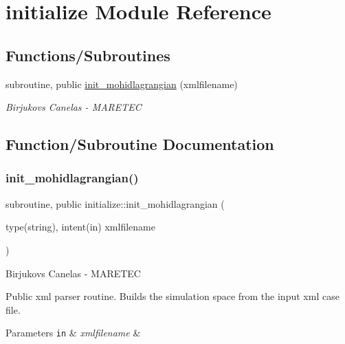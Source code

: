 \hypertarget{namespaceinitialize}{}\section{initialize Module Reference}
\label{namespaceinitialize}
\subsection*{Functions/\+Subroutines}
\begin{DoxyCompactItemize}
\item 
subroutine, public \mbox{\hyperlink{namespaceinitialize_a0872e23f1959251154095edd3808e019}{init\+\_\+mohidlagrangian}} (xmlfilename)
\begin{DoxyCompactList}\small\item\em Birjukovs Canelas -\/ M\+A\+R\+E\+T\+EC \end{DoxyCompactList}\end{DoxyCompactItemize}


\subsection{Function/\+Subroutine Documentation}
\mbox{\label{namespaceinitialize_a0872e23f1959251154095edd3808e019}} 
\subsubsection{\texorpdfstring{init\+\_\+mohidlagrangian()}{init\_mohidlagrangian()}}
{\footnotesize\ttfamily subroutine, public initialize\+::init\+\_\+mohidlagrangian (\begin{DoxyParamCaption}\item[{type(string), intent(in)}]{xmlfilename }\end{DoxyParamCaption})}



Birjukovs Canelas -\/ M\+A\+R\+E\+T\+EC 

Public xml parser routine. Builds the simulation space from the input xml case file. 
\begin{DoxyParams}[1]{Parameters}
\mbox{\tt in}  & {\em xmlfilename} & \\
\hline
\end{DoxyParams}
